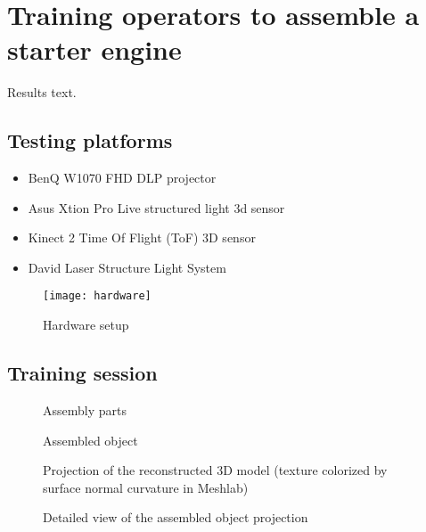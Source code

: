 \section{Training operators to assemble a starter engine}\label{sec:results}

Results text.

\subsection{Testing platforms}

\begin{itemize}
	\item BenQ W1070 FHD DLP projector
	\item Asus Xtion Pro Live structured light 3d sensor
	\item Kinect 2 Time Of Flight (ToF) 3D sensor
	\item David Laser Structure Light System
\end{itemize}

\begin{figure}[ht]
	\centering
	\texttt{[image: hardware]}
	\caption{Hardware setup}
	\label{fig:hardware}
\end{figure}


\subsection{Training session}

\begin{figure}[H]
	\begin{floatrow}[2]
		{\caption{Assembly parts}\label{fig:assembly-parts}}
		{\caption{Assembled object}\label{fig:assembled-object}}
	\end{floatrow}
\end{figure}

\begin{figure}[H]
	\begin{floatrow}[2]
		{\caption{Projection of the reconstructed 3D model (texture colorized by surface normal curvature in Meshlab)}\label{fig:projection-mapping-1}}
		{\caption{Detailed view of the assembled object projection}\label{fig:projection-mapping-2}}
	\end{floatrow}
\end{figure}



